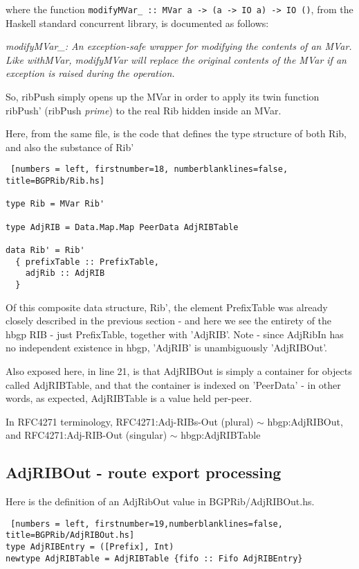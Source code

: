 where the function \lstinline{modifyMVar_ :: MVar a -> (a -> IO a) -> IO ()}, from the Haskell standard concurrent library, is documented as follows:

\textit{modifyMVar\_: An exception-safe wrapper for modifying the contents of an MVar.
Like withMVar, modifyMVar will replace the original contents of the MVar if an exception is raised during the operation.
}

So, ribPush simply opens up the MVar in order to apply its twin function ribPush' (ribPush \textit{prime}) to the real Rib hidden inside an MVar.

Here, from the same file, is the code that defines the type structure of both Rib, and also the substance of Rib'
\begin{lstlisting} [numbers = left, firstnumber=18, numberblanklines=false, title=BGPRib/Rib.hs]

type Rib = MVar Rib'

type AdjRIB = Data.Map.Map PeerData AdjRIBTable

data Rib' = Rib'
  { prefixTable :: PrefixTable,
    adjRib :: AdjRIB
  }

\end{lstlisting}

Of this composite data structure, Rib', the element PrefixTable was already closely described in the previous section - and here we see the entirety of the hbgp RIB - just PrefixTable, together with 'AdjRIB'.  Note - since AdjRibIn has no independent existence in hbgp, 'AdjRIB' is unambiguously 'AdjRIBOut'.

Also exposed here, in line 21,  is that AdjRIBOut is simply a container for objects called AdjRIBTable, and that the container is indexed on 'PeerData' - in other words, as expected, AdjRIBTable is a value held per-peer.

In RFC4271 terminology, RFC4271:Adj-RIBs-Out (plural) $\sim$  hbgp:AdjRIBOut, and RFC4271:Adj-RIB-Out (singular) 
$\sim$ hbgp:AdjRIBTable


\subsection{AdjRIBOut - route export processing} \label{adjribout}

Here is the definition of an AdjRibOut value in BGPRib/AdjRIBOut.hs.

\begin{lstlisting} [numbers = left, firstnumber=19,numberblanklines=false, title=BGPRib/AdjRIBOut.hs]
type AdjRIBEntry = ([Prefix], Int)
newtype AdjRIBTable = AdjRIBTable {fifo :: Fifo AdjRIBEntry}
\end{lstlisting}


